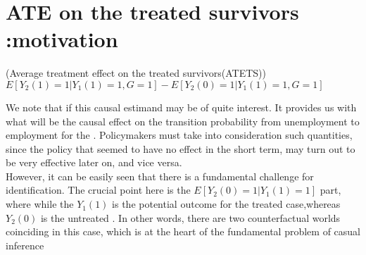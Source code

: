 \documentclass{article}
\begin{document}
\section{ATE on the treated survivors :motivation}

\begin{definition}
    (Average treatment effect on the treated survivors(ATETS))\\
    $  E[Y_2(1) =1| Y_1(1)=1, G=1 ] - E[ Y_2(0) = 1 | Y_1(1) =1, G=1] $
\end{definition}

We note that if this causal estimand may be of quite interest. It provides us with what will be the causal effect on the transition probability from unemployment to employment for the . Policymakers must take into consideration such quantities, since the policy that seemed to have no effect in the short term, may turn out to be very effective later on, and vice versa. \\
However, it can be easily seen that there is a fundamental challenge for identification.
The crucial point here is the $ E [ Y_2(0) = 1 | Y_1(1) = 1] $ part, where while the $Y_1(1) $ 
is the potential outcome for the treated case,whereas $ Y_2(0) $ is the untreated . In other words, there are two counterfactual worlds coinciding in this case, which is at the heart of the fundamental problem of casual inference \cite{imbens2015causal} \\
\end{document}
